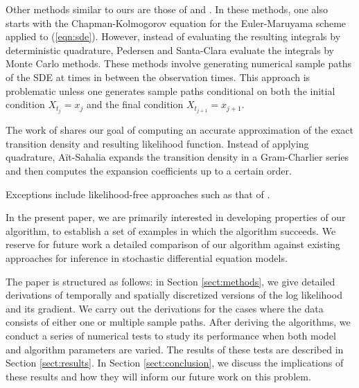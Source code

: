 \documentclass[wcp]{jmlr}
\begin{document}
Other methods similar to ours are those of \citep{Pedersen1995} and \citep{SantaClara1997}.  In these methods, one also starts with the Chapman-Kolmogorov equation for the Euler-Maruyama scheme applied to (\ref{eqn:sde}).  However, instead of evaluating the resulting integrals by deterministic quadrature, Pedersen and Santa-Clara evaluate the integrals by Monte Carlo methods.  These methods involve generating numerical sample paths of the SDE at times in between the observation times.  This approach is problematic unless one generates sample paths conditional on both the initial condition $X_{t_j} = x_j$ and the final condition $X_{t_{j+1}} = x_{j+1}$.

The work of \citep{Sahaliaclosedform} shares our goal of computing an accurate approximation of the exact transition density and resulting likelihood function.  Instead of applying quadrature, A\"it-Sahalia expands the transition density in a Gram-Charlier series and then computes the expansion coefficients up to a certain order.  

Exceptions include likelihood-free approaches such as that of \citep{Picchini2014}.

In the present paper, we are primarily interested in developing properties of our algorithm, to establish a set of examples in which the algorithm succeeds.  We reserve for future work a detailed comparison of our algorithm against existing approaches for inference in stochastic differential equation models.

The paper is structured as follows: in Section \ref{sect:methods}, we give detailed derivations of temporally and spatially discretized versions of the log likelihood and its gradient.  We carry out the derivations for the cases where the data consists of either one or multiple sample paths.  After deriving the algorithms, we conduct a series of numerical tests to study its performance when both model and algorithm parameters are varied.  The results of these tests are described in Section \ref{sect:results}.  In Section \ref{sect:conclusion}, we discuss the implications of these results and how they will inform our future work on this problem.
\end{document}
